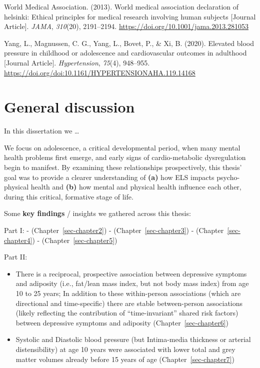 \documentclass[
  letterpaper,
  DIV=11,
  numbers=noendperiod]{scrreport}
\newlength{\cslhangindent}
\newenvironment{CSLReferences}[2] %
 {\begin{list}{}{%
  \setlength{\itemindent}{0pt}
  \setlength{\leftmargin}{0pt}
  \setlength{\parsep}{0pt}
  \ifodd #1
   \setlength{\leftmargin}{\cslhangindent}
   \setlength{\itemindent}{-1\cslhangindent}
  \fi
  \setlength{\itemsep}{#2\baselineskip}}}
 {\end{list}}
\providecommand{\tightlist}{%
  \setlength{\itemsep}{0pt}\setlength{\parskip}{0pt}}
\begin{document}
\begin{CSLReferences}{1}{0}
World Medical Association. (2013). World medical association declaration
of helsinki: Ethical principles for medical research involving human
subjects {[}Journal Article{]}. \emph{JAMA}, \emph{310}(20), 2191--2194.
\url{https://doi.org/10.1001/jama.2013.281053}

Yang, L., Magnussen, C. G., Yang, L., Bovet, P., \& Xi, B. (2020).
Elevated blood pressure in childhood or adolescence and cardiovascular
outcomes in adulthood {[}Journal Article{]}. \emph{Hypertension},
\emph{75}(4), 948--955.
\url{https://doi.org/doi:10.1161/HYPERTENSIONAHA.119.14168}

\end{CSLReferences}


\chapter{General discussion}\label{general-discussion}

In this dissertation we \ldots{}

We focus on adolescence, a critical developmental period, when many
mental health problems first emerge, and early signs of cardio-metabolic
dysregulation begin to manifest. By examining these relationships
prospectively, this thesis' goal was to provide a clearer understanding
of \textbf{(a)} how ELS impacts psycho-physical health and \textbf{(b)}
how mental and physical health influence each other, during this
critical, formative stage of life.

Some \textbf{key findings} / insights we gathered across this thesis:

Part I: - (Chapter~\ref{sec-chapter2}) - (Chapter~\ref{sec-chapter3}) -
(Chapter~\ref{sec-chapter4}) - (Chapter~\ref{sec-chapter5})

Part II:

\begin{itemize}
\tightlist
\item
  There is a reciprocal, prospective association between depressive
  symptoms and adiposity (i.e., fat/lean mass index, but not body mass
  index) from age 10 to 25 years; In addition to these within-person
  associations (which are directional and time-specific) there are
  stable between-person associations (likely reflecting the contribution
  of ``time-invariant'' shared risk factors) between depressive symptoms
  and adiposity (Chapter~\ref{sec-chapter6})
\item
  Systolic and Diastolic blood pressure (but Intima-media thickness or
  arterial distensibility) at age 10 years were associated with lower
  total and grey matter volumes already before 15 years of age
  (Chapter~\ref{sec-chapter7})
\end{itemize}
\end{document}
